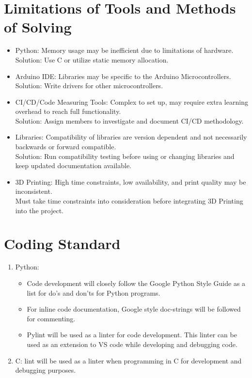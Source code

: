 \documentclass[12pt]{article}
\begin{document}
\section{Limitations of Tools and Methods of Solving}

\begin{itemize}
\item Python: Memory usage may be inefficient due to limitations of hardware. \\ Solution: Use C or utilize static memory allocation.
\item Arduino IDE: Libraries may be specific to the Arduino Microcontrollers. \\ Solution: Write drivers for other microcontrollers.
\item CI/CD/Code Measuring Tools: Complex to set up, may require extra learning overhead to reach full functionality. \\ Solution: Assign members to investigate and document CI/CD methodology.
\item Libraries: Compatibility of libraries are version dependent and not necessarily backwards or forward compatible. \\ Solution: Run compatibility testing before using or changing libraries and keep updated documentation available.
\item 3D Printing: High time constraints, low availability, and print quality may be inconsistent. \\ Must take time constraints into consideration before integrating 3D Printing into the project.
\end{itemize}

\section{Coding Standard}
\begin{enumerate}
\item Python:
\begin{itemize} 
\item Code development will closely follow the Google Python Style Guide as a list for do's and don'ts for Python programs.
\item For inline code documentation, Google style doc-strings will be followed for commenting.
\item Pylint will be used as a linter for code development. This linter can be used as an extension to VS code while developing and debugging code.
\end{itemize}
\item C: lint will be used as a linter when programming in C for development and debugging purposes.
\end{enumerate}
\newpage
\end{document}
